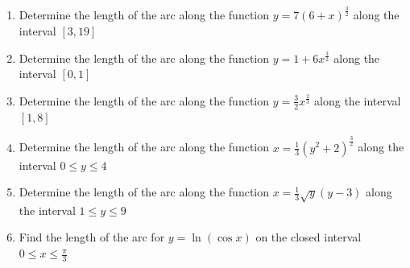 \documentclass[../main.tex]{subfiles}
\begin{document}
\label{Arc length}
\begin{enumerate}[itemsep=0.7cm]
    \item 
    Determine the length of the arc along the function $y=7(6+x)^{\frac{3}{2}}$ along the interval $[3,19]$

    \item
    Determine the length of the arc along the function $y=1+6x^{\frac{3}{2}}$ along the interval $[0,1]$

    \item 
    Determine the length of the arc along the function $y=\frac{3}{2}x^{\frac{2}{3}}$ along the interval $[1,8]$

    \item 
    Determine the length of the arc along the function $x=\frac{1}{3}(y^2+2)^{\frac{3}{2}}$ along the interval $0\leq y \leq 4$

    \item 
    Determine the length of the arc along the function $x=\frac{1}{3}\sqrt{y}(y-3)$ along the interval $1\leq y \leq 9$

    \item 
    Find the length of the arc for $y=\ln{(\cos{x})}$ on the closed interval $0 \leq x \leq \frac{\pi}{3}$

\end{enumerate}
\end{document}
